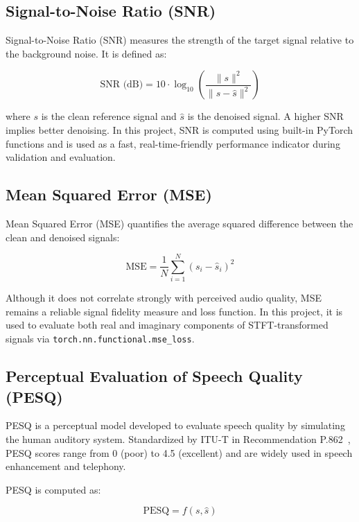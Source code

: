 \subsection{Signal-to-Noise Ratio (SNR)}
\label{subsec:snr}

Signal-to-Noise Ratio (SNR) measures the strength of the target signal relative to the background noise. It is defined as:

\begin{equation}
\text{SNR (dB)} = 10 \cdot \log_{10} \left( \frac{\| s \|^2}{\| s - \hat{s} \|^2} \right)
\end{equation}

where $s$ is the clean reference signal and $\hat{s}$ is the denoised signal. A higher SNR implies better denoising. In this project, SNR is computed using built-in PyTorch functions and is used as a fast, real-time-friendly performance indicator during validation and evaluation.

\subsection{Mean Squared Error (MSE)}
\label{subsec:mse}

Mean Squared Error (MSE) quantifies the average squared difference between the clean and denoised signals:

\begin{equation}
\text{MSE} = \frac{1}{N} \sum_{i=1}^{N} (s_i - \hat{s}_i)^2
\end{equation}

Although it does not correlate strongly with perceived audio quality, MSE remains a reliable signal fidelity measure and loss function. In this project, it is used to evaluate both real and imaginary components of STFT-transformed signals via \texttt{torch.nn.functional.mse\_loss}.

\subsection{Perceptual Evaluation of Speech Quality (PESQ)}
\label{subsec:pesq}

PESQ is a perceptual model developed to evaluate speech quality by simulating the human auditory system. Standardized by ITU-T in Recommendation P.862~\cite{pesq_metric}, PESQ scores range from 0 (poor) to 4.5 (excellent) and are widely used in speech enhancement and telephony.

PESQ is computed as:

\begin{equation}
\text{PESQ} = f(s, \hat{s})
\end{equation}

